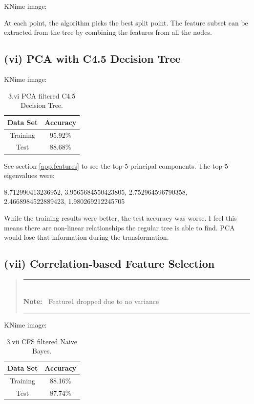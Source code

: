 \documentclass[11pt]{article}
\newlength{\Lnote}
\newcommand{\note}[1]
{\addtolength{\leftmargini}{4em}
	\settowidth{\Lnote}{\textbf{Note:~}}
	\begin{quote}
		\rule{\dimexpr\textwidth-2\leftmargini}{1pt}\\
		\mbox{}\hspace{-\Lnote}\textbf{Note:~}%
		#1\\[-0.5ex] 
		\rule{\dimexpr\textwidth-2\leftmargini}{1pt}
	\end{quote}
	\addtolength{\leftmargini}{-4em}}
\begin{document}
KNime image: 

At each point, the algorithm picks the best split point. The feature subset can be extracted from the tree by combining the features from all the nodes.

\subsection{(vi) PCA with C4.5 Decision Tree}

KNime image: 

\begin{table}[H]
	\centering
	\begin{tabular}{ | c | c | }
		\hline
		\textbf{Data Set} & \textbf{Accuracy} \\
		\hline
		Training & 95.92\% \\
		\hline
		Test & 88.68\% \\
		\hline
	\end{tabular}
	\caption{3.vi PCA filtered C4.5 Decision Tree.}
\end{table}

See section \ref{app.features} to see the top-5 principal components. The top-5 eigenvalues were:

8.712990413236952, 
3.9565684550423805, 
2.752964596790358, 
2.4668984522889423, 
1.980269212245705

While the training results were better, the test accuracy was worse. I feel this means there are non-linear relationships the regular tree is able to find. PCA would lose that information during the transformation.

\subsection{(vii) Correlation-based Feature Selection}

\note{Feature1 dropped due to no variance}

KNime image: 

\begin{table}[H]
	\centering
	\begin{tabular}{ | c | c | }
		\hline
		\textbf{Data Set} & \textbf{Accuracy} \\
		\hline
		Training & 88.16\% \\
		\hline
		Test & 87.74\% \\
		\hline
	\end{tabular}
	\caption{3.vii CFS filtered Naive Bayes.}
\end{table}
\end{document}
